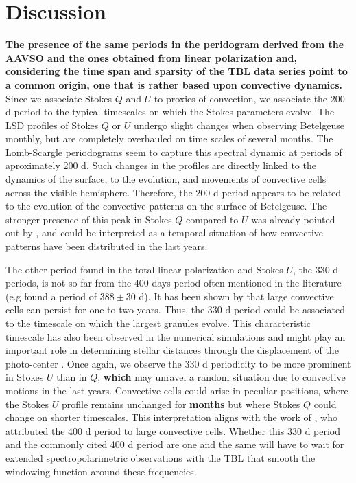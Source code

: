 \documentclass{aa}
\begin{document}
\section{Discussion}
\label{section 4}
 
\textbf{The presence of the same 
periods in the peridogram derived from the AAVSO and the ones obtained from linear polarization and, considering the time span and sparsity of the TBL data series point to a common origin, one that is rather based upon convective dynamics.} Since we associate Stokes $Q$ and $U$ to proxies of convection, we associate the 200 d period to the typical timescales on which the Stokes parameters evolve. 
The LSD profiles of Stokes $Q$ or $U$ undergo slight changes when observing Betelgeuse monthly, but are completely overhauled 
on time scales of several months. The Lomb-Scargle periodograms seem to capture this spectral dynamic at periods of aproximately 200 d. Such changes in the profiles are directly linked to the dynamics of the surface,  to  the evolution, and movements 
of convective cells across the visible hemisphere. Therefore, the 200 d period appears to be related to the evolution of the convective patterns 
on the surface of Betelgeuse.  The stronger presence of this peak in Stokes $Q$ compared to $U$ was already pointed out by \cite{mathias_evolution_2018}, and could be interpreted as a temporal situation of how convective patterns have been distributed in the
last years.\

The other period found in the total linear polarization and Stokes $U$, the 330 d periods, is not so far from the 400 days period often mentioned in the literature (e.g \cite{kiss_variability_2006} found a period of $388 \pm 30$ d). It has been shown by \cite{lopez_ariste_convective_2018} that large convective cells can persist for one to two years. Thus, the 330 d period could be associated to the timescale on which the largest granules evolve. This characteristic timescale has also been observed in the numerical simulations and might play an important role in determining stellar distances through the displacement of the photo-center \citep{chiavassa_probing_2022}. Once again, we observe the 330 d periodicity to be more prominent in Stokes $U$ than in $Q$, \textbf{which} may unravel a random situation due to convective motions in the last years. Convective cells could arise in peculiar positions, where the Stokes $U$ profile remains unchanged for \textbf{months} but where Stokes $Q$ could change on shorter timescales. This interpretation aligns with the work of \cite{gray_mass_2008}, who attributed the 400 d period to large convective cells. Whether this 330 d period and the commonly cited 400 d period are one and the same will have to wait for extended spectropolarimetric observations with the TBL that smooth the windowing function around these frequencies.  \
\end{document}

